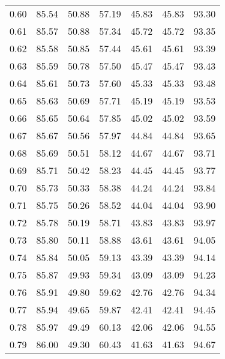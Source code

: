 \begin{tabular}{|c|c|c|c|c|c|c|}
      0.60 &     85.54 &     50.88 &      57.19 &   45.83 &      45.83 &         93.30 \\
      0.61 &     85.57 &     50.88 &      57.34 &   45.72 &      45.72 &         93.35 \\
      0.62 &     85.58 &     50.85 &      57.44 &   45.61 &      45.61 &         93.39 \\
      0.63 &     85.59 &     50.78 &      57.50 &   45.47 &      45.47 &         93.43 \\
      0.64 &     85.61 &     50.73 &      57.60 &   45.33 &      45.33 &         93.48 \\
      0.65 &     85.63 &     50.69 &      57.71 &   45.19 &      45.19 &         93.53 \\
      0.66 &     85.65 &     50.64 &      57.85 &   45.02 &      45.02 &         93.59 \\
      0.67 &     85.67 &     50.56 &      57.97 &   44.84 &      44.84 &         93.65 \\
      0.68 &     85.69 &     50.51 &      58.12 &   44.67 &      44.67 &         93.71 \\
      0.69 &     85.71 &     50.42 &      58.23 &   44.45 &      44.45 &         93.77 \\
      0.70 &     85.73 &     50.33 &      58.38 &   44.24 &      44.24 &         93.84 \\
      0.71 &     85.75 &     50.26 &      58.52 &   44.04 &      44.04 &         93.90 \\
      0.72 &     85.78 &     50.19 &      58.71 &   43.83 &      43.83 &         93.97 \\
      0.73 &     85.80 &     50.11 &      58.88 &   43.61 &      43.61 &         94.05 \\
      0.74 &     85.84 &     50.05 &      59.13 &   43.39 &      43.39 &         94.14 \\
      0.75 &     85.87 &     49.93 &      59.34 &   43.09 &      43.09 &         94.23 \\
      0.76 &     85.91 &     49.80 &      59.62 &   42.76 &      42.76 &         94.34 \\
      0.77 &     85.94 &     49.65 &      59.87 &   42.41 &      42.41 &         94.45 \\
      0.78 &     85.97 &     49.49 &      60.13 &   42.06 &      42.06 &         94.55 \\
      0.79 &     86.00 &     49.30 &      60.43 &   41.63 &      41.63 &         94.67 \\

\end{tabular}
